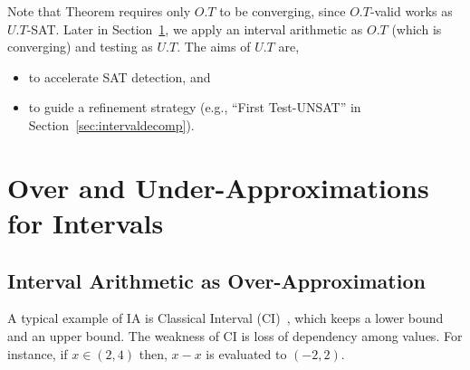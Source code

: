 \documentclass[runningheads,a4paper,oribibl]{llncs}
\newcommand{\suppress}[1]{} %
\begin{document}
Note that Theorem requires only $O.T$ to be converging, since $O.T$-valid works 
as $U.T$-SAT. Later in Section~\ref{sec:approximation}, we apply an interval 
arithmetic as $O.T$ (which is converging) and testing as $U.T$. 
The aims of $U.T$ are, 
\begin{itemize}
\item to accelerate SAT detection, and 
\item to guide a refinement strategy (e.g., ``First Test-UNSAT'' in 
Section~\ref{sec:intervaldecomp}). 
\end{itemize}

\section{Over and Under-Approximations for Intervals} \label{sec:approximation}

\suppress{
We present \emph{Interval Arithmetic} and \emph{Testing} as an over-approximation theory 
${O.T}$ and an under-approximation theory, ${U.T}$, respectively. 
For interval arithmetic, we apply Affine intervals (AI)~\cite{StolfiThesis} and 
Chebyshev Affine interval (CAI)~\cite{tapas12}. 

}

\subsection{Interval Arithmetic as Over-Approximation}
A typical example of IA is Classical Interval (CI)~\cite{moore}, 
which keeps a lower bound and an upper bound. The weakness of CI is loss of dependency 
among values. For instance, if $x \in (2,4)$ then, $x - x$ is evaluated to $(-2,2)$.
\end{document}
